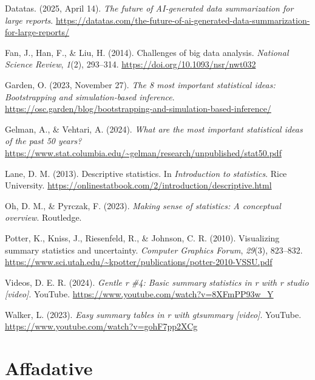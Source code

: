 \documentclass[
  man,
  floatsintext,
  longtable,
  nolmodern,
  notxfonts,
  notimes,
  colorlinks=true,linkcolor=blue,citecolor=blue,urlcolor=blue]{apa7}
\newlength{\cslhangindent}
\newenvironment{CSLReferences}[2] %
 {\begin{list}{}{%
  \setlength{\itemindent}{0pt}
  \setlength{\leftmargin}{0pt}
  \setlength{\parsep}{0pt}
  \ifodd #1
   \setlength{\leftmargin}{\cslhangindent}
   \setlength{\itemindent}{-1\cslhangindent}
  \fi
  \setlength{\itemsep}{#2\baselineskip}}}
 {\end{list}}
\begin{document}
\label{refs}
\begin{CSLReferences}{1}{0}
Datatas. (2025, April 14). \emph{The future of AI-generated data
summarization for large reports}.
\url{https://datatas.com/the-future-of-ai-generated-data-summarization-for-large-reports/}

Fan, J., Han, F., \& Liu, H. (2014). Challenges of big data analysis.
\emph{National Science Review}, \emph{1}(2), 293--314.
\url{https://doi.org/10.1093/nsr/nwt032}

Garden, O. (2023, November 27). \emph{The 8 most important statistical
ideas: Bootstrapping and simulation-based inference}.
\url{https://osc.garden/blog/bootstrapping-and-simulation-based-inference/}

Gelman, A., \& Vehtari, A. (2024). \emph{What are the most important
statistical ideas of the past 50 years?}
\url{https://www.stat.columbia.edu/~gelman/research/unpublished/stat50.pdf}

Lane, D. M. (2013). Descriptive statistics. In \emph{Introduction to
statistics}. Rice University.
\url{https://onlinestatbook.com/2/introduction/descriptive.html}

Oh, D. M., \& Pyrczak, F. (2023). \emph{Making sense of statistics: A
conceptual overview}. Routledge.

Potter, K., Kniss, J., Riesenfeld, R., \& Johnson, C. R. (2010).
Visualizing summary statistics and uncertainty. \emph{Computer Graphics
Forum}, \emph{29}(3), 823--832.
\url{https://www.sci.utah.edu/~kpotter/publications/potter-2010-VSSU.pdf}

Videos, D. E. R. (2024). \emph{Gentle r \#4: Basic summary statistics in
r with r studio {[}video{]}}. YouTube.
\url{https://www.youtube.com/watch?v=8XFmPP93w_Y}

Walker, L. (2023). \emph{Easy summary tables in r with gtsummary
{[}video{]}}. YouTube. \url{https://www.youtube.com/watch?v=gohF7pp2XCg}

\end{CSLReferences}

\newpage

\section{Affadative}\label{affadative}
\end{document}
